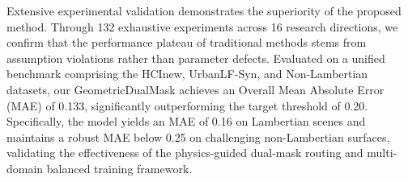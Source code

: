 Extensive experimental validation demonstrates the superiority of the proposed method. Through 132 exhaustive experiments across 16 research directions, we confirm that the performance plateau of traditional methods stems from assumption violations rather than parameter defects. Evaluated on a unified benchmark comprising the HCInew, UrbanLF-Syn, and Non-Lambertian datasets, our GeometricDualMask achieves an Overall Mean Absolute Error (MAE) of 0.133, significantly outperforming the target threshold of 0.20. Specifically, the model yields an MAE of 0.16 on Lambertian scenes and maintains a robust MAE below 0.25 on challenging non-Lambertian surfaces, validating the effectiveness of the physics-guided dual-mask routing and multi-domain balanced training framework.